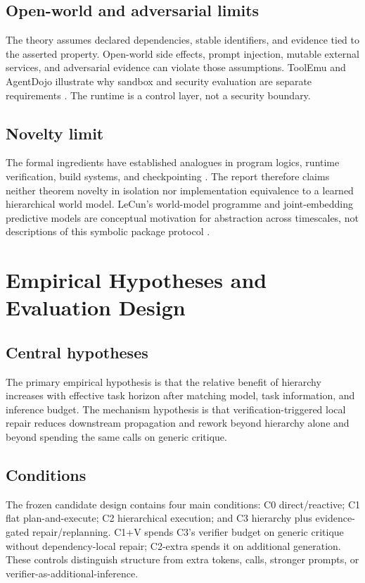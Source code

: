 \documentclass[11pt,a4paper]{article}
\begin{document}
\subsection{Open-world and adversarial limits}
The theory assumes declared dependencies, stable identifiers, and evidence tied to the asserted property. Open-world side effects, prompt injection, mutable external services, and adversarial evidence can violate those assumptions. ToolEmu and AgentDojo illustrate why sandbox and security evaluation are separate requirements \cite{ruan2024toolemu,debenedetti2024agentdojo}. The runtime is a control layer, not a security boundary.

\subsection{Novelty limit}
The formal ingredients have established analogues in program logics, runtime verification, build systems, and checkpointing \cite{hoare1969axiomatic,leucker2009runtime,mokhov2018build,daly2006higher}. The report therefore claims neither theorem novelty in isolation nor implementation equivalence to a learned hierarchical world model. LeCun's world-model programme and joint-embedding predictive models are conceptual motivation for abstraction across timescales, not descriptions of this symbolic package protocol \cite{lecun2022path,bardes2024vjepa}.


\section{Empirical Hypotheses and Evaluation Design}
\subsection{Central hypotheses}
The primary empirical hypothesis is that the relative benefit of hierarchy increases with effective task horizon after matching model, task information, and inference budget. The mechanism hypothesis is that verification-triggered local repair reduces downstream propagation and rework beyond hierarchy alone and beyond spending the same calls on generic critique.

\subsection{Conditions}
The frozen candidate design contains four main conditions: C0 direct/reactive; C1 flat plan-and-execute; C2 hierarchical execution; and C3 hierarchy plus evidence-gated repair/replanning. C1+V spends C3's verifier budget on generic critique without dependency-local repair; C2-extra spends it on additional generation. These controls distinguish structure from extra tokens, calls, stronger prompts, or verifier-as-additional-inference.
\end{document}
